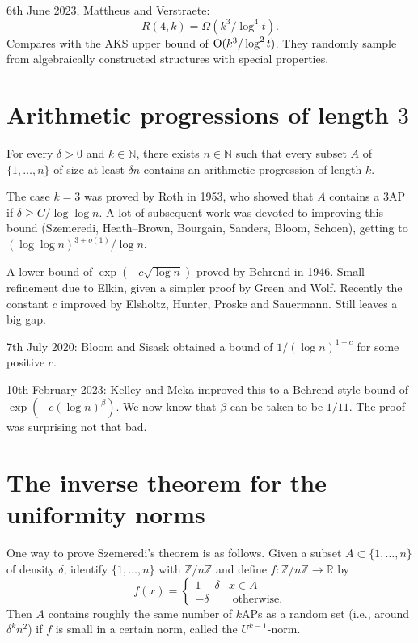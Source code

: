 \documentclass[reqno]{amsart} 
\begin{document}
6th June 2023, Mattheus and Verstraete:
\begin{equation*}
  R(4, k) = \Omega(k^3 / \log^4 t).
\end{equation*}
Compares with the AKS upper bound of $\operatorname{O}(k^3 / \log^2 t)$.  They randomly sample from algebraically constructed structures with special properties.

\section{Arithmetic progressions of length $3$}

\begin{theorem}[Szemeredi, 1975]
  For every $\delta > 0$ and $k \in \mathbb{N}$, there exists $n \in \mathbb{N}$ such that every subset $A$ of $\{1, \dotsc, n\}$ of size at least $\delta n$ contains an arithmetic progression of length $k$.  
\end{theorem}

The case $k = 3$ was proved by Roth in 1953, who showed that $A$ contains a 3AP if $\delta \geq C / \log \log n$.  A lot of subsequent work was devoted to improving this bound (Szemeredi, Heath--Brown, Bourgain, Sanders, Bloom, Schoen), getting to $(\log \log n)^{3 + o(1)} / \log n$.

A lower bound of $\exp(- c \sqrt{\log n})$ proved by Behrend in 1946.  Small refinement due to Elkin, given a simpler proof by Green and Wolf.  Recently the constant $c$ improved by Elsholtz, Hunter, Proske and Sauermann.  Still leaves a big gap.

7th July 2020: Bloom and Sisask obtained a bound of $1 /(\log n)^{1 + c}$ for some positive $c$.

10th February 2023: Kelley and Meka improved this to a Behrend-style bound of $\exp(- c(\log n)^\beta)$.  We now know that $\beta$ can be taken to be $1/11$.  The proof was surprising not that bad.

\section{The inverse theorem for the uniformity norms}

One way to prove Szemeredi's theorem is as follows.  Given a subset $A \subset \{1, \dotsc, n\}$ of density $\delta$, identify $\{1, \dotsc, n\}$ with $\mathbb{Z} / n  \mathbb{Z}$ and define $f : \mathbb{Z} / n \mathbb{Z} \rightarrow \mathbb{R}$ by
\begin{equation*}
  f(x) =
  \begin{cases}
    1 - \delta &  x \in A \\
    - \delta               & \text{ otherwise}.
  \end{cases}
\end{equation*}
Then $A$ contains roughly the same number of $k$APs as a random set (i.e., around $\delta^k n^2$) if $f$ is small in a certain norm, called the $U^{k - 1}$-norm.
\end{document}
